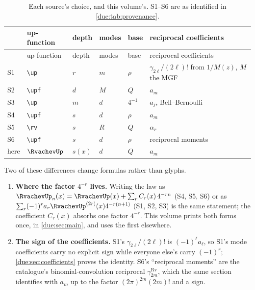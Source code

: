 \documentclass[11pt,oneside]{article}
\theoremstyle{plain}
\theoremstyle{definition}
\theoremstyle{remark}
\newcommand{\upn}[1]{\RvachevUp_{#1}}
\newcommand{\dep}[1]{s\!\left(#1\right)}                    %
\newcommand{\Qq}{Q}                                         %
\newcommand{\am}[1]{a_{#1}}                                 %
\newcommand{\Cr}[2]{C_{#1}\!\left(#2\right)}                %
\begin{document}
\begin{longtable}{@{}l l l l l l@{}}
\caption{Each source's choice, and this volume's.  S1--S6 are as identified in
\cref{due:tab:provenance}.}
\label{due:tab:concordance}\\
\toprule
& up-function & depth & modes & base & reciprocal coefficients\\
\midrule
\endfirsthead
\toprule
& up-function & depth & modes & base & reciprocal coefficients\\
\midrule
\endhead
S1 & \verb|\up|  & \(r\) & \(m\) & \(\rho\) & \(\gamma_{2\ell}/(2\ell)!\)
  from \(1/M(z)\), \(M\) the MGF\\
S2 & \verb|\upf| & \(d\) & \(M\) & \(Q\) & \(a_m\)\\
S3 & \verb|\up|  & \(m\) & \(d\) & \(4^{-1}\) & \(a_j\), Bell--Bernoulli\\
S4 & \verb|\upf| & \(s\) & \(d\) & \(\rho\) & \(a_m\)\\
S5 & \verb|\rv|  & \(s\) & \(R\) & \(Q\) & \(\alpha_r\)\\
S6 & \verb|\upf| & \(s\) & \(d\) & \(\rho\) & reciprocal moments\\
\midrule
here & \(\RvachevUp\) & \(\dep{x}\) & \(d\) & \(\Qq\) & \(\am{m}\)\\
\bottomrule
\end{longtable}

Two of these differences change formulas rather than glyphs.

\begin{enumerate}
\item \textbf{Where the factor \(4^{-r}\) lives.}  Writing the law as
  \(\upn{n}(x)=\RvachevUp(x)+\sum_{r}\Cr{r}{x}4^{-rn}\) (S4, S5, S6) or as
  \(\sum_{r}(-1)^{r}\am{r}\RvachevUp^{(2r)}(x)4^{-r(n+1)}\) (S1, S2, S3) is
  the same statement; the coefficient \(\Cr{r}{x}\) absorbs one factor
  \(4^{-r}\).  This volume prints both forms once, in \cref{due:sec:main},
  and uses the first elsewhere.
\item \textbf{The sign of the coefficients.}  S1's \(\gamma_{2\ell}/(2\ell)!\)
  is \((-1)^{\ell}\am{\ell}\), so S1's mode coefficients carry no explicit
  sign while everyone else's carry \((-1)^{r}\); \cref{due:sec:coefficients}
  proves the identity.  S6's ``reciprocal moments'' are the catalogue's
  binomial-convolution reciprocal \(\gamma^{\mathrm{Rv}}_{2m}\), which the
  same section identifies with \(\am{m}\) up to the factor
  \((2\pi)^{2m}(2m)!\) and a sign.
\end{enumerate}
\end{document}
